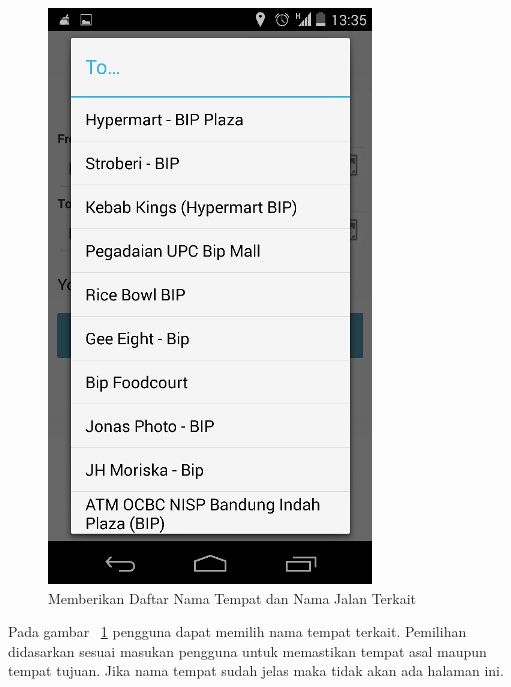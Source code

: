 \begin{figure}[h]
	\centering
		\includegraphics[scale=0.5]{Gambar/KIRI_Android/terkait}
	\caption{Memberikan Daftar Nama Tempat dan Nama Jalan Terkait}
	\label{fig:terkait}
\end{figure}

Pada gambar ~\ref{fig:terkait} pengguna dapat memilih nama tempat terkait. Pemilihan didasarkan sesuai masukan pengguna untuk memastikan tempat asal maupun tempat tujuan. Jika nama tempat sudah jelas maka tidak akan ada halaman ini.

